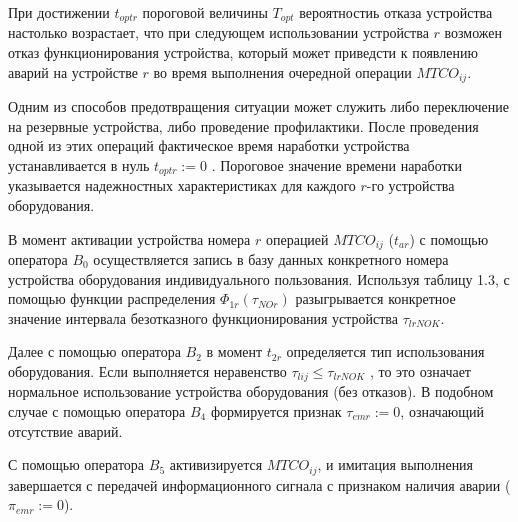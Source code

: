 При достижении $t_{optr}$ пороговой величины $T_{opt}$ вероятностиь отказа устройства настолько возрастает, что при следующем использовании устройства $r$ возможен отказ функционирования устройства, который может приведсти к появлению аварий на устройстве $r$ во время выполнения очередной операции $MTCO_{ij}$.

Одним из способов предотвращения ситуации может служить либо переключение на резервные устройства, либо проведение профилактики. После проведения одной из этих операций фактическое время наработки устройства устанавливается в нуль $t_{optr}:=0$ . Пороговое значение времени наработки указывается надежностных характеристиках для каждого $r$-го устройства оборудования.

В момент активации устройства номера $r$ операцией $MTCO_{ij}$ ($t_{ar}$) с помощью оператора $B_0$ осуществляется запись в базу данных конкретного номера устройства оборудования индивидуального пользования. Используя таблицу 1.3, с помощью функции распределения $\Phi_{1r}(\tau_{NOr})$  разыгрывается конкретное значение интервала безотказного функционирования устройства $\tau_{lrNOK}$.

Далее с помощью оператора $B_2$ в момент $t_{2r}$ определяется тип использования оборудования. Если выполняется неравенство $\tau_{lij}  \leq  \tau_{lrNOK}$ , то это означает нормальное использование устройства оборудования (без отказов). В подобном случае с помощью оператора $B_4$ формируется признак $\tau_{emr}:=0$, означающий отсутствие аварий.

С помощью оператора $B_5$ активизируется $MTCO_{ij}$, и имитация выполнения завершается с передачей информационного сигнала с признаком наличия аварии  ($\pi_{emr}:=0$).

